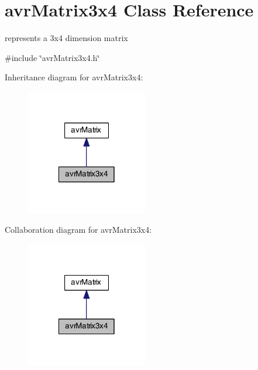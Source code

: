 \hypertarget{classavr_matrix3x4}{\section{avr\-Matrix3x4 Class Reference}
\label{classavr_matrix3x4}
}


represents a 3x4 dimension matrix  




{\ttfamily \#include \char`\"{}avr\-Matrix3x4.\-h\char`\"{}}



Inheritance diagram for avr\-Matrix3x4\-:\nopagebreak
\begin{figure}[H]
\begin{center}
\leavevmode
\includegraphics[width=150pt]{classavr_matrix3x4__inherit__graph}
\end{center}
\end{figure}


Collaboration diagram for avr\-Matrix3x4\-:\nopagebreak
\begin{figure}[H]
\begin{center}
\leavevmode
\includegraphics[width=150pt]{classavr_matrix3x4__coll__graph}
\end{center}
\end{figure}

